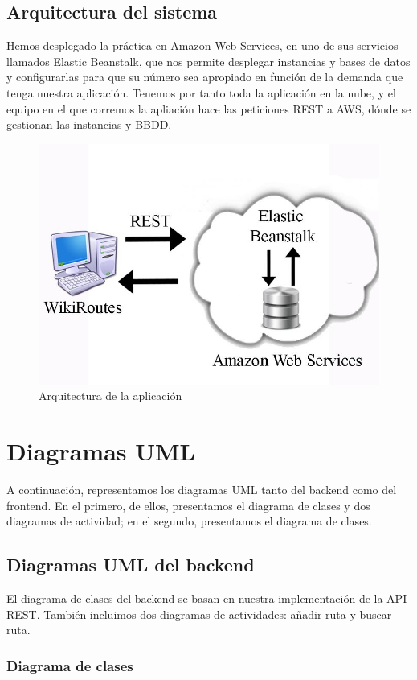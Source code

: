 \documentclass[11pt,a4paper]{article}
\begin{document}
\subsection{Arquitectura del sistema}
Hemos desplegado la práctica en Amazon Web Services, en uno de sus servicios llamados Elastic Beanstalk, que nos permite desplegar instancias y bases de datos y configurarlas para que su número sea apropiado en función de la demanda que tenga nuestra aplicación. Tenemos por tanto toda la aplicación en la nube, y el equipo en el que corremos la apliación hace las peticiones REST a AWS, dónde se gestionan las instancias y BBDD.
\begin{figure}[htbp]
\centering
\includegraphics[width=0.7\linewidth]{imagenes/arquitectura}
\caption{Arquitectura de la aplicación}
\label{fig:arquitectura}
\end{figure}


\clearpage

\section{Diagramas UML}

A continuación, representamos los diagramas UML tanto del backend como del frontend. En el primero, de ellos, presentamos el diagrama de clases y dos diagramas de actividad; en el segundo, presentamos el diagrama de clases.

\subsection{Diagramas UML del backend}

El diagrama de clases del backend se basan en nuestra implementación de la API REST. También incluimos dos diagramas de actividades: añadir ruta y buscar ruta.  

\subsubsection{Diagrama de clases}
\end{document}
